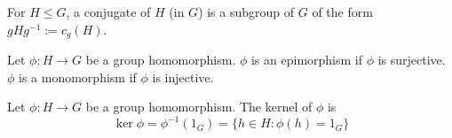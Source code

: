 \begin{corol-defn}
For \(H \leq G\), a conjugate of \(H\) (in \(G\)) is a subgroup of \(G\) of the form \(gHg^{-1} := c_g(H)\).
\end{corol-defn}

\begin{definition}
    Let \(\phi: H \to G\) be a group homomorphism. \(\phi\) is an epimorphism if \(\phi\) is surjective. \(\phi\) is a monomorphism if \(\phi\) is injective.
\end{definition}


\begin{definition}
    Let \(\phi: H \to G\) be a group homomorphism. The kernel of \(\phi\) is
    \[\ker \phi = \phi^{-1}(1_G) = \{h \in H: \phi(h) = 1_G\}\]
\end{definition}

